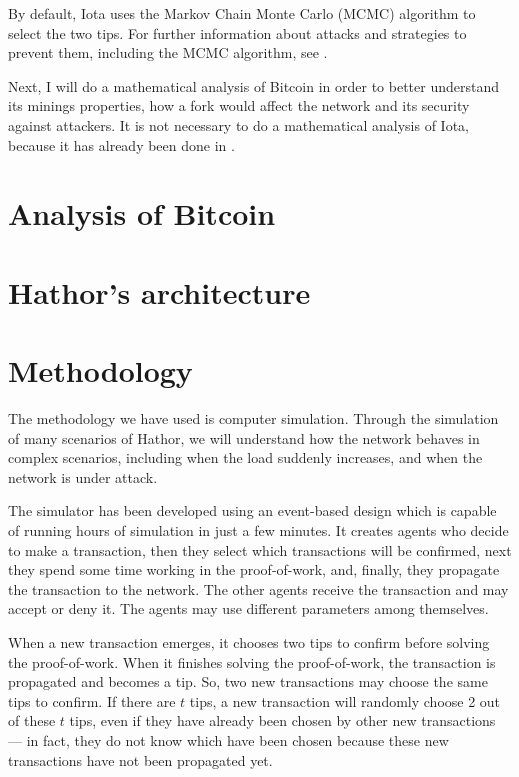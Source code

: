 By default, Iota uses the Markov Chain Monte Carlo (MCMC) algorithm to select the two tips. For further information about attacks and strategies to prevent them, including the MCMC algorithm, see \cite{tangle2016}.

Next, I will do a mathematical analysis of Bitcoin in order to better understand its minings properties, how a fork would affect the network and its security against attackers. It is not necessary to do a mathematical analysis of Iota, because it has already been done in \citet{tangle2016}.


\chapter{Analysis of Bitcoin}



\chapter{Hathor's architecture}



\chapter{Methodology}

The methodology we have used is computer simulation. Through the simulation of many scenarios of Hathor, we will understand how the network behaves in complex scenarios, including when the load suddenly increases, and when the network is under attack.

The simulator has been developed using an event-based design which is capable of running hours of simulation in just a few minutes. It creates agents who decide to make a transaction, then they select which transactions will be confirmed, next they spend some time working in the proof-of-work, and, finally, they propagate the transaction to the network. The other agents receive the transaction and may accept or deny it. The agents may use different parameters among themselves.

When a new transaction emerges, it chooses two tips to confirm before solving the proof-of-work. When it finishes solving the proof-of-work, the transaction is propagated and becomes a tip. So, two new transactions may choose the same tips to confirm. If there are $t$ tips, a new transaction will randomly choose 2 out of these $t$ tips, even if they have already been chosen by other new transactions --- in fact, they do not know which have been chosen because these new transactions have not been propagated yet.

